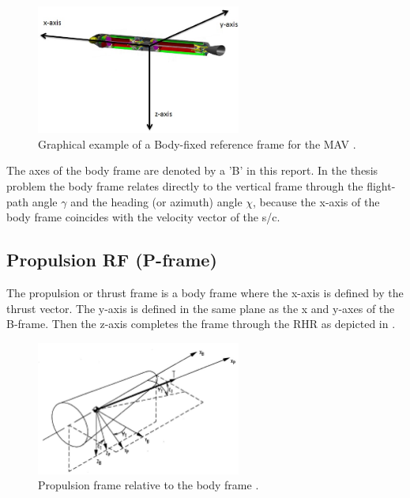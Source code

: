  


\begin{figure}[!ht]
\centering
\includegraphics[width=0.6\textwidth]{figures/reference_frames/baseline_liquid_trinidad2012_bframe.jpg}
\caption{Graphical example of a Body-fixed reference frame for the \ac{MAV} \cite{trinidad2012}.}
\label{fig:baseline_liquid_trinidad2012_bframe}
\end{figure}


The axes of the body frame are denoted by a 'B' in this report. In the thesis problem the body frame relates directly to the vertical frame through the flight-path angle $\gamma$ and the heading (or azimuth) angle $\chi$, because the x-axis of the body frame coincides with the velocity vector of the \ac{s/c}. 



\subsection{Propulsion \ac{RF} (P-frame)}
\label{subsec:propframe}
The propulsion or thrust frame is a body frame where the x-axis is defined by the thrust vector. The y-axis is defined in the same plane as the x and y-axes of the B-frame. Then the z-axis completes the frame through the \ac{RHR} as depicted in .

\begin{figure}[!ht]
\centering
\includegraphics[width=0.6\textwidth]{figures/reference_frames/propframe_mooij1994motion.jpg}
\caption{Propulsion frame relative to the body frame \cite{mooij1994motion}.}
\label{fig:propframe_mooij1994motion}
\end{figure}

